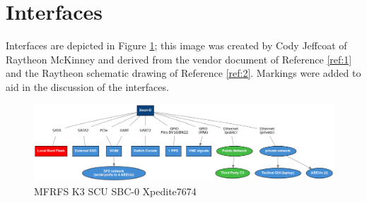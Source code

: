 \documentclass[12pt]{article}
\begin{document}
\section{Interfaces}
Interfaces are depicted in Figure \ref{fig:inteface}; this image was created by Cody Jeffcoat of Raytheon McKinney and derived from the vendor document of Reference \ref{ref:1} and the Raytheon schematic drawing of Reference \ref{ref:2}. Markings were added to aid in the discussion of the interfaces.

\begin{figure}[H]
\begin{center}
\includegraphics[width=1.0\textwidth]{img/interface}
\caption{MFRFS K3 SCU SBC-0 Xpedite7674}
\label{fig:inteface}
\end{center}
\end{figure}
\end{document}

